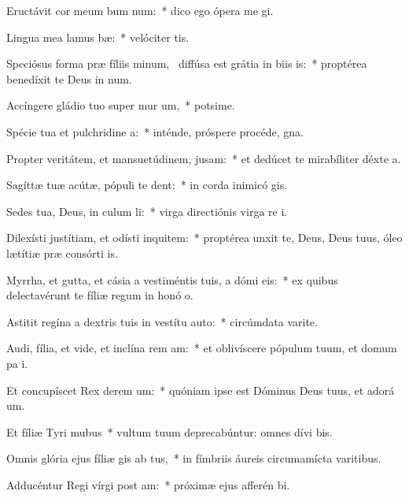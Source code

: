 \item Eructávit cor meum bum num:~* dico ego ópera me gi.
\item Lingua mea lamus bæ:~* velóciter tis.
\item Speciósus forma præ fíliis minum,~\pscross{} diffúsa est grátia in biis is:~* proptérea benedíxit te Deus in num.
\item Accíngere gládio tuo super mur um,~* potsime.
\item Spécie tua et pulchridine a:~* inténde, próspere procéde,  gna.
\item Propter veritátem, et mansuetúdinem,  jusam:~* et dedúcet te mirabíliter déxte a.
\item Sagíttæ tuæ acútæ, pópuli  te dent:~* in corda inimicó gis.
\item Sedes tua, Deus, in culum li:~* virga directiónis virga re i.
\item Dilexísti justítiam, et odísti inquitem:~* proptérea unxit te, Deus, Deus tuus, óleo lætítiæ præ consórti is.
\item Myrrha, et gutta, et cásia a vestiméntis tuis, a dómi eis:~* ex quibus delectavérunt te fíliæ regum in honó o.
\item Astitit regína a dextris tuis in vestítu auto:~* circúmdata varite.
\item Audi, fília, et vide, et inclína rem am:~* et oblivíscere pópulum tuum, et domum pa i.
\item Et concupíscet Rex derem um:~* quóniam ipse est Dóminus Deus tuus, et adorá um.
\item Et fíliæ Tyri  mubus~* vultum tuum deprecabúntur: omnes dívi bis.
\item Omnis glória ejus fíliæ gis ab tus,~* in fímbriis áureis circumamícta varitibus.
\item Adducéntur Regi vírgi post am:~* próximæ ejus afferén bi.
